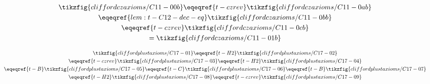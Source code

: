 \begin{derivation}\label{lem:t-C13-dec-eq}
\begin{gather*}
    \tikzfig{cliffordczaxioms/C11-00b}
    \eqeqref{t-czrev}\tikzfig{cliffordczaxioms/C11-0ab}\\
    \eqeqref{lem:t-C12-dec-eq}\tikzfig{cliffordczaxioms/C11-0bb}\\
    \eqeqref{t-czrev}\tikzfig{cliffordczaxioms/C11-0cb}\\
    =\tikzfig{cliffordczaxioms/C11-01b}
\end{gather*}
\end{derivation}

\begin{derivation}\label{lem:t-C17-dec-eq}
\begin{gather*}
    \tikzfig{cliffordplustaxioms/C17-01}
    \eqeqref{t-H2}\tikzfig{cliffordplustaxioms/C17-02}\\
    \eqeqref{t-czrev}\tikzfig{cliffordplustaxioms/C17-03}
    \eqeqref{t-H2}\tikzfig{cliffordplustaxioms/C17-04}\\
    \eqeqref{t-B}\tikzfig{cliffordplustaxioms/C17-05}
    \eqeqref{t-C}\tikzfig{cliffordplustaxioms/C17-06}
    \eqeqref{t-B}\tikzfig{cliffordplustaxioms/C17-07}\\
    \eqeqref{t-H2}\tikzfig{cliffordplustaxioms/C17-08}
    \eqeqref{t-czrev}\tikzfig{cliffordplustaxioms/C17-09}
\end{gather*}
\end{derivation}

